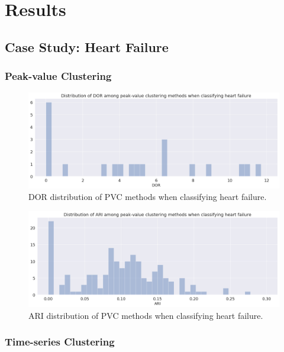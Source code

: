 \chapter{Results}

\section{Case Study: Heart Failure}

\subsection{Peak-value Clustering}

\begin{figure}[h!]
    \begin{center}
    \includegraphics[width=\textwidth]{results/pvc-hf-dor.png}
    \end{center}
    \caption{DOR distribution of PVC methods when classifying heart failure.}
    \label{fig:pvc_hf_dor}
\end{figure}

\begin{figure}[!h]
    \begin{center}
    \includegraphics[width=\textwidth]{results/pvc-hf-ari.png}
    \end{center}
    \caption{ARI distribution of PVC methods when classifying heart failure.}
    \label{fig:pvc_hf_ari}
\end{figure}

\subsection{Time-series Clustering}

